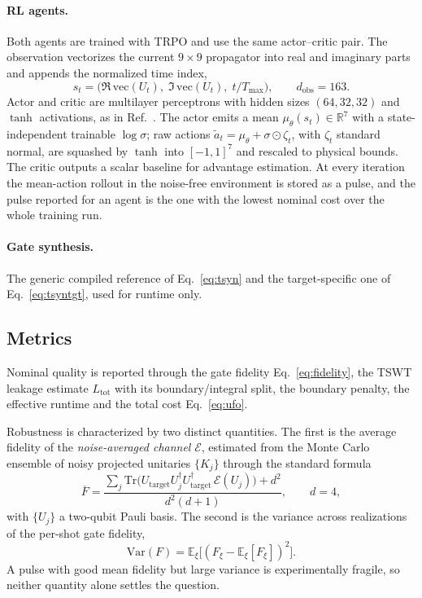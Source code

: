 \documentclass[aps,prx,twocolumn,superscriptaddress,nofootinbib,amsmath,amssymb,floatfix]{revtex4-2}
\newcommand{\Ltot}{L_{\mathrm{tot}}}
\newcommand{\Utgt}{U_{\mathrm{target}}}
\newcommand{\Fbar}{\overline{F}}
\begin{document}
\paragraph*{RL agents.}
Both agents are trained with TRPO and use the same actor--critic pair. The observation vectorizes the current $9\times9$ propagator into
real and imaginary parts and appends the normalized time index,
\begin{equation}
s_t=\bigl(\Re\,\mathrm{vec}(U_t),\;\Im\,\mathrm{vec}(U_t),\;t/T_{\max}\bigr),
\qquad d_{\mathrm{obs}}=163 .
\label{eq:obs}
\end{equation}
Actor and critic are multilayer perceptrons with hidden sizes $(64,32,32)$ and $\tanh$ activations, as
in Ref.~\cite{Niu2019}. The actor emits a mean $\mu_\theta(s_t)\in\mathbb{R}^7$ with a
state-independent trainable $\log\sigma$; raw actions $\tilde a_t=\mu_\theta+\sigma\odot\zeta_t$, with
$\zeta_t$ standard normal, are squashed by $\tanh$ into $[-1,1]^7$ and rescaled to physical bounds. The
critic outputs a scalar baseline for advantage estimation. At every iteration the mean-action rollout in
the noise-free environment is stored as a pulse, and the pulse reported for an agent is the one with the
lowest nominal cost over the whole training run.

\paragraph*{Gate synthesis.}
The generic compiled reference of Eq.~\eqref{eq:tsyn} and the target-specific one of
Eq.~\eqref{eq:tsyntgt}, used for runtime only.

\subsection{Metrics}
\label{sec:metrics}

Nominal quality is reported through the gate fidelity Eq.~\eqref{eq:fidelity}, the TSWT leakage
estimate $\Ltot$ with its boundary/integral split, the boundary penalty, the effective runtime and the
total cost Eq.~\eqref{eq:ufo}.

Robustness is characterized by two distinct quantities. The first is the average fidelity of the
\emph{noise-averaged channel} $\mathcal{E}$, estimated from the Monte Carlo ensemble of noisy projected
unitaries $\{K_j\}$ through the standard formula~\cite{Nielsen2002}
\begin{equation}
\Fbar=\frac{\sum_{j}\mathrm{Tr}\bigl(\Utgt U_j^{\dagger}\Utgt^{\dagger}\,\mathcal{E}(U_j)\bigr)+d^{2}}{d^{2}(d+1)},
\qquad d=4,
\label{eq:favg}
\end{equation}
with $\{U_j\}$ a two-qubit Pauli basis. The second is the variance across realizations of the
per-shot gate fidelity,
\begin{equation}
\mathrm{Var}(F)=\mathbb{E}_{\xi}\bigl[(F_\xi-\mathbb{E}_\xi[F_\xi])^{2}\bigr].
\label{eq:fvar}
\end{equation}
A pulse with good mean fidelity but large variance is experimentally fragile, so neither quantity
alone settles the question.
\end{document}
